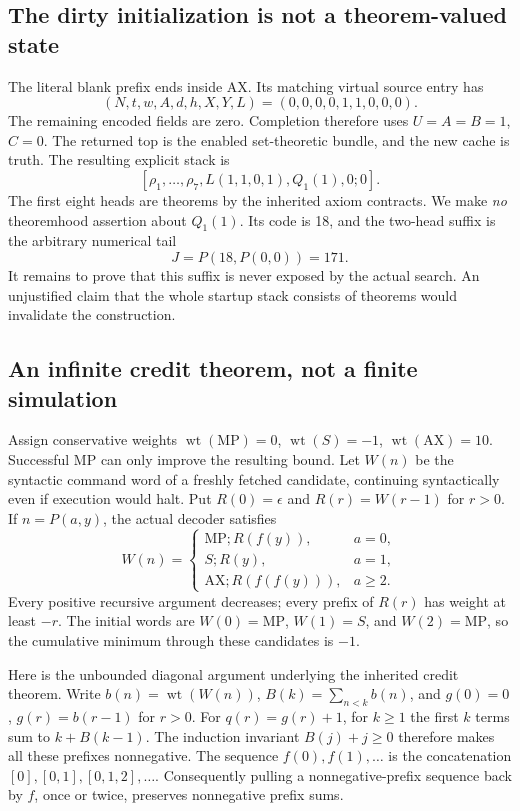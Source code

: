\subsection{The dirty initialization is not a theorem-valued state}
The literal blank prefix ends inside AX. Its matching virtual source entry has
\[
(N,t,w,A,d,h,X,Y,L)=(0,0,0,0,1,1,0,0,0).
\]
 The remaining encoded fields are zero. Completion therefore uses $U=A=B=1$, $C=0$. The returned top is the enabled set-theoretic bundle, and the new cache is truth. The resulting explicit stack is
\[
[\rho_1,\ldots,\rho_7,L(1,1,0,1),Q_1(1),0;0].
\]
The first eight heads are theorems by the inherited axiom contracts. We make \emph{no} theoremhood assertion about $Q_1(1)$. Its code is 18, and the two-head suffix is the arbitrary numerical tail
\[
J=P(18,P(0,0))=171.
\]
It remains to prove that this suffix is never exposed by the actual search. An unjustified claim that the whole startup stack consists of theorems would invalidate the construction.

\subsection{An infinite credit theorem, not a finite simulation}
Assign conservative weights $\operatorname{wt}(\mathrm{MP})=0$, $\operatorname{wt}(S)=-1$, $\operatorname{wt}(\mathrm{AX})=10$. Successful MP can only improve the resulting bound. Let $W(n)$ be the syntactic command word of a freshly fetched candidate, continuing syntactically even if execution would halt. Put $R(0)=\epsilon$ and $R(r)=W(r-1)$ for $r>0$. If $n=P(a,y)$, the actual decoder satisfies
\[
W(n)=\begin{cases}
\mathrm{MP};R(f(y)),&a=0,\\
S;R(y),&a=1,\\
\mathrm{AX};R(f(f(y))),&a\ge2.
\end{cases}
\]
Every positive recursive argument decreases; every prefix of $R(r)$ has weight at least $-r$. The initial words are $W(0)=\mathrm{MP}$, $W(1)=S$, and $W(2)=\mathrm{MP}$, so the cumulative minimum through these candidates is $-1$.

Here is the unbounded diagonal argument underlying the inherited credit theorem. Write $b(n)=\operatorname{wt}(W(n))$, $B(k)=\sum_{n<k}b(n)$, and $g(0)=0$, $g(r)=b(r-1)$ for $r>0$. For $q(r)=g(r)+1$, for $k\ge1$ the first $k$ terms sum to $k+B(k-1)$. The induction invariant $B(j)+j\ge0$ therefore makes all these prefixes nonnegative. The sequence $f(0),f(1),\ldots$ is the concatenation $[0],[0,1],[0,1,2],\ldots$. Consequently pulling a nonnegative-prefix sequence back by $f$, once or twice, preserves nonnegative prefix sums.

